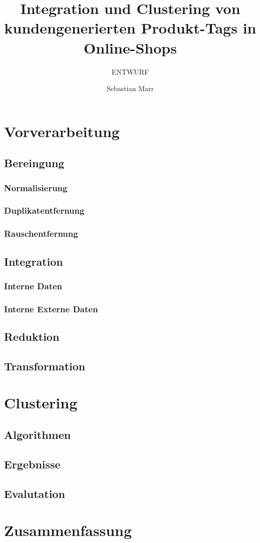 \documentclass[a4paper,listof=totoc]{scrreprt}
\author{Sebastian Marr}
\title{Integration und Clustering von kundengenerierten Produkt-Tags in Online-Shops}
\subtitle{ENTWURF}
\begin{document}
\maketitle

\tableofcontents



\chapter{Vorverarbeitung}

\section{Bereingung}
\subsection{Normalisierung}
\subsection{Duplikatentfernung}
\subsection{Rauschentfernung}

\section{Integration}
\subsection{Interne Daten}
\subsection{Interne Externe Daten}

\section{Reduktion}

\section{Transformation}

\chapter{Clustering}

\section{Algorithmen}
\section{Ergebnisse}
\section{Evalutation}

\chapter{Zusammenfassung}

\nocite{*}


\clearpage
{}

\end{document}

